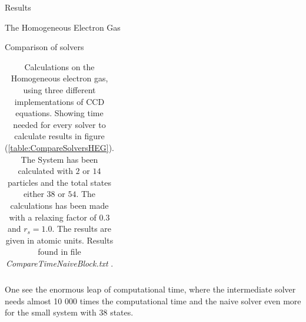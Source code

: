 \documentclass[twoside,english]{uiofysmaster}
\begin{document}
\begin{chapter}{Results}
\begin{section}{The Homogeneous Electron Gas}
\begin{subsection}{Comparison of solvers}
\begin{table}[H]
\begin{center}
\begin{tabular}[center]{l | c  c  c  r}
					\end{tabular}
				\end{center}
				\caption{Calculations on the Homogeneous electron gas, using three different implementations of CCD equations. Showing time needed for every solver to calculate results in figure (\ref{table:CompareSolversHEG}). The System has been calculated with $2$ or $14$ particles and the total states either $38$ or $54$. The calculations has been made with a relaxing factor of $0.3$ and $r_s = 1.0$. The results are given in atomic units. Results found in file \textit{CompareTimeNaiveBlock.txt} \cite{WholmenGithub}.}
				\label{table:CompareSolversTimeHEG}
			\end{table}
			One see the enormous leap of computational time, where the intermediate solver needs almost 10 000 times the computational time and the naive solver even more for the small system with $38$ states. 
		\end{subsection}
 		

\end{section}
\end{chapter}
\end{document}
